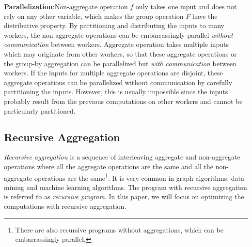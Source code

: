 
\textbf{Parallelization}:Non-aggregate operation $f$ only takes one input and does not rely on any other variable, which makes the group operation $F$ have the distributive property. By partitioning and distributing the inputs to many workers, the non-aggregate operations can be embarrassingly parallel \emph{without communication} between workers. Aggregate operation takes multiple inputs which may originate from other workers, so that these aggregate operations or the group-by aggregation can be parallelized but \emph{with communication} between workers. If the inputs for multiple aggregate operations are disjoint, these aggregate operations can be parallelized without communication by carefully partitioning the inputs. However, this is usually impossible since the inputs probably result from the previous computations on other workers and cannot be particularly partitioned.



\subsection{Recursive Aggregation}


\emph{Recursive aggregation} is a sequence of interleaving aggregate and non-aggregate operations where all the aggregate operations are the same and all the non-aggregate operations are the same\footnote{There are also recursive programs without aggregations, which can be embarrassingly parallel.}. It is very common in graph algorithms, data mining and machine learning algorithms. The program with recursive aggregation is referred to as \emph{recursive program}. In this paper, we will focus on optimizing the computations with recursive aggregation.

